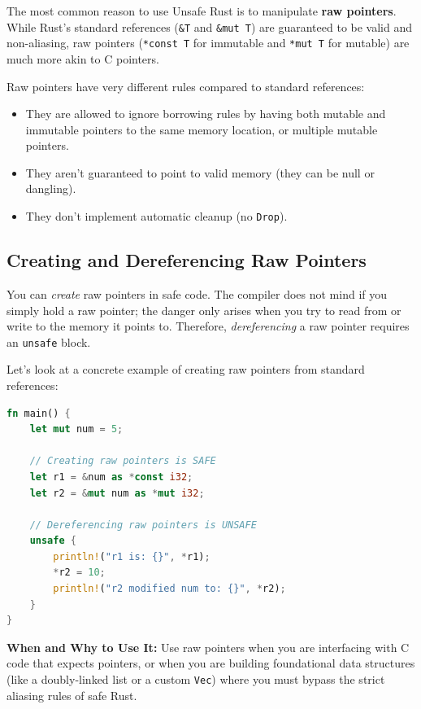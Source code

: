 The most common reason to use Unsafe Rust is to manipulate \textbf{raw pointers}. While Rust's standard references (\texttt{\&T} and \texttt{\&mut T}) are guaranteed to be valid and non-aliasing, raw pointers (\texttt{*const T} for immutable and \texttt{*mut T} for mutable) are much more akin to C pointers. 

Raw pointers have very different rules compared to standard references:
\begin{itemize}
    \item They are allowed to ignore borrowing rules by having both mutable and immutable pointers to the same memory location, or multiple mutable pointers.
    \item They aren't guaranteed to point to valid memory (they can be null or dangling).
    \item They don't implement automatic cleanup (no \texttt{Drop}).
\end{itemize}

\subsection{Creating and Dereferencing Raw Pointers}

You can \textit{create} raw pointers in safe code. The compiler does not mind if you simply hold a raw pointer; the danger only arises when you try to read from or write to the memory it points to. Therefore, \textit{dereferencing} a raw pointer requires an \texttt{unsafe} block.

Let's look at a concrete example of creating raw pointers from standard references:

\begin{lstlisting}[language=Rust]
fn main() {
    let mut num = 5;

    // Creating raw pointers is SAFE
    let r1 = &num as *const i32;
    let r2 = &mut num as *mut i32;

    // Dereferencing raw pointers is UNSAFE
    unsafe {
        println!("r1 is: {}", *r1);
        *r2 = 10;
        println!("r2 modified num to: {}", *r2);
    }
}
\end{lstlisting}

\textbf{When and Why to Use It:} Use raw pointers when you are interfacing with C code that expects pointers, or when you are building foundational data structures (like a doubly-linked list or a custom \texttt{Vec}) where you must bypass the strict aliasing rules of safe Rust.

